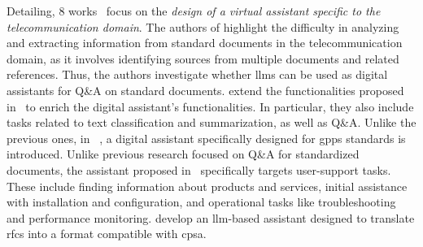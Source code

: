 %
Detailing, $8$ works~\cite{ahmed2024linguistic, piovesan2024telecom, karapantelakis2024using, roychowdhury2024unlocking, shen2024large, soman2023observations, duclos2024utilizing, erak2024leveraging} focus on the \emph{design of a virtual assistant specific to the telecommunication domain}.
%
The authors of \cite{roychowdhury2024unlocking, piovesan2024telecom} highlight the difficulty in analyzing and extracting information from standard documents in the telecommunication domain, as it involves identifying sources from multiple documents and related references.
Thus, the authors investigate whether \glspl{llm} can be used as digital assistants for Q\&A on standard documents.
\citet{ahmed2024linguistic} extend the functionalities proposed in~\cite{roychowdhury2024unlocking} to enrich the digital assistant's functionalities.
In particular, they also include tasks related to text classification and summarization, as well as Q\&A.
%
Unlike the previous ones, in ~\cite{karapantelakis2024using, erak2024leveraging}, a digital assistant specifically designed for \glspl{gpp} standards is introduced. 
%
Unlike previous research focused on Q\&A for standardized documents, the assistant proposed in~\cite{soman2023observations} specifically targets user-support tasks.
These include finding information about products and services, initial assistance with installation and configuration, and operational tasks like troubleshooting and performance monitoring.
\citet{duclos2024utilizing} develop an \gls{llm}-based assistant designed to translate \glspl{rfc} into a format compatible with \gls{cpsa}.





